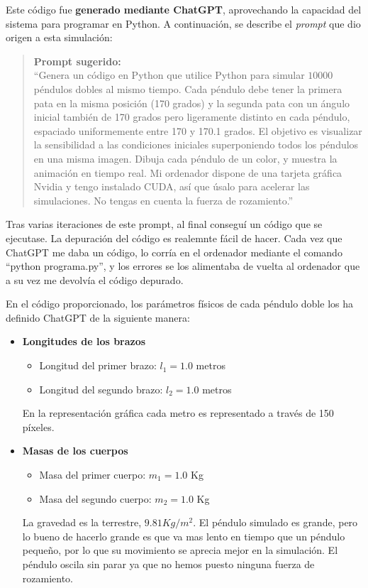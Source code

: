 \documentclass[
  11pt,
  a4paper,
  DIV=11,
  numbers=noendperiod]{scrreprt}
\providecommand{\tightlist}{%
  \setlength{\itemsep}{0pt}\setlength{\parskip}{0pt}}
\begin{document}
Este código fue \textbf{generado mediante ChatGPT}, aprovechando la
capacidad del sistema para programar en Python. A continuación, se
describe el \emph{prompt} que dio origen a esta simulación:

\begin{quote}
\textbf{Prompt sugerido:}\\
``Genera un código en Python que utilice Python para simular \(10000\)
péndulos dobles al mismo tiempo. Cada péndulo debe tener la primera pata
en la misma posición (170 grados) y la segunda pata con un ángulo
inicial también de 170 grados pero ligeramente distinto en cada péndulo,
espaciado uniformemente entre 170 y 170.1 grados. El objetivo es
visualizar la sensibilidad a las condiciones iniciales superponiendo
todos los péndulos en una misma imagen. Dibuja cada péndulo de un color,
y muestra la animación en tiempo real. Mi ordenador dispone de una
tarjeta gráfica Nvidia y tengo instalado CUDA, así que úsalo para
acelerar las simulaciones. No tengas en cuenta la fuerza de
rozamiento.''
\end{quote}

Tras varias iteraciones de este prompt, al final conseguí un código que
se ejecutase. La depuración del código es realemnte fácil de hacer. Cada
vez que ChatGPT me daba un código, lo corría en el ordenador mediante el
comando ``python programa.py'', y los errores se los alimentaba de
vuelta al ordenador que a su vez me devolvía el código depurado.

En el código proporcionado, los parámetros físicos de cada péndulo doble
los ha definido ChatGPT de la siguiente manera:

\begin{itemize}
\item
  \textbf{Longitudes de los brazos}

  \begin{itemize}
  \tightlist
  \item
    Longitud del primer brazo: \(l_1 = 1.0\) metros\\
  \item
    Longitud del segundo brazo: \(l_2 = 1.0\) metros
  \end{itemize}

  En la representación gráfica cada metro es representado a través de
  150 píxeles.
\item
  \textbf{Masas de los cuerpos}

  \begin{itemize}
  \tightlist
  \item
    Masa del primer cuerpo: \(m_1 = 1.0\) Kg
  \item
    Masa del segundo cuerpo: \(m_2 = 1.0\) Kg
  \end{itemize}

  La gravedad es la terrestre, \(9.81 Kg/m^2\). El péndulo simulado es
  grande, pero lo bueno de hacerlo grande es que va mas lento en tiempo
  que un péndulo pequeño, por lo que su movimiento se aprecia mejor en
  la simulación. El péndulo oscila sin parar ya que no hemos puesto
  ninguna fuerza de rozamiento.
\end{itemize}
\end{document}
